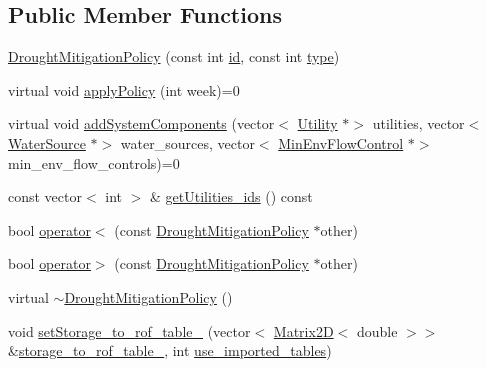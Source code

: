 \subsection*{Public Member Functions}
\begin{DoxyCompactItemize}
\item 
\mbox{\hyperlink{classDroughtMitigationPolicy_a00cce0117a5bc0c446727e0c0c59a8df_a00cce0117a5bc0c446727e0c0c59a8df}{Drought\+Mitigation\+Policy}} (const int \mbox{\hyperlink{classDroughtMitigationPolicy_abf3ed19ed98e0d74dc9ae24094be640b_abf3ed19ed98e0d74dc9ae24094be640b}{id}}, const int \mbox{\hyperlink{classDroughtMitigationPolicy_aaea5016d1462bec889cb8df85aececc6_aaea5016d1462bec889cb8df85aececc6}{type}})
\item 
virtual void \mbox{\hyperlink{classDroughtMitigationPolicy_a76c1a85eaf7707306fe173b6437cc31d_a76c1a85eaf7707306fe173b6437cc31d}{apply\+Policy}} (int week)=0
\item 
virtual void \mbox{\hyperlink{classDroughtMitigationPolicy_aaab042a79d781afe8e08753b7012372a_aaab042a79d781afe8e08753b7012372a}{add\+System\+Components}} (vector$<$ \mbox{\hyperlink{classUtility}{Utility}} $\ast$$>$ utilities, vector$<$ \mbox{\hyperlink{classWaterSource}{Water\+Source}} $\ast$$>$ water\+\_\+sources, vector$<$ \mbox{\hyperlink{classMinEnvFlowControl}{Min\+Env\+Flow\+Control}} $\ast$$>$ min\+\_\+env\+\_\+flow\+\_\+controls)=0
\item 
const vector$<$ int $>$ \& \mbox{\hyperlink{classDroughtMitigationPolicy_aad53e4f995e3fe18b580f39d15daeefc_aad53e4f995e3fe18b580f39d15daeefc}{get\+Utilities\+\_\+ids}} () const
\item 
bool \mbox{\hyperlink{classDroughtMitigationPolicy_a0bf7d0fa94377ae6814e529daf0204c4_a0bf7d0fa94377ae6814e529daf0204c4}{operator$<$}} (const \mbox{\hyperlink{classDroughtMitigationPolicy}{Drought\+Mitigation\+Policy}} $\ast$other)
\item 
bool \mbox{\hyperlink{classDroughtMitigationPolicy_a576d3ddb09dc9372898a63c0949d08a6_a576d3ddb09dc9372898a63c0949d08a6}{operator$>$}} (const \mbox{\hyperlink{classDroughtMitigationPolicy}{Drought\+Mitigation\+Policy}} $\ast$other)
\item 
virtual \mbox{\hyperlink{classDroughtMitigationPolicy_a91ff1ca816dcb044e1e10a6c2a8e56a0_a91ff1ca816dcb044e1e10a6c2a8e56a0}{$\sim$\+Drought\+Mitigation\+Policy}} ()
\item 
void \mbox{\hyperlink{classDroughtMitigationPolicy_a75710a6ab73213223222b3472f9251c0_a75710a6ab73213223222b3472f9251c0}{set\+Storage\+\_\+to\+\_\+rof\+\_\+table\+\_\+}} (vector$<$ \mbox{\hyperlink{classMatrix2D}{Matrix2D}}$<$ double $>$$>$ \&\mbox{\hyperlink{classDroughtMitigationPolicy_aa7d724adcd8ebcd5641de13b8f08098c_aa7d724adcd8ebcd5641de13b8f08098c}{storage\+\_\+to\+\_\+rof\+\_\+table\+\_\+}}, int \mbox{\hyperlink{classDroughtMitigationPolicy_ace2a2425f6608c34a3189c11445978a1_ace2a2425f6608c34a3189c11445978a1}{use\+\_\+imported\+\_\+tables}})

\end{DoxyCompactItemize}
